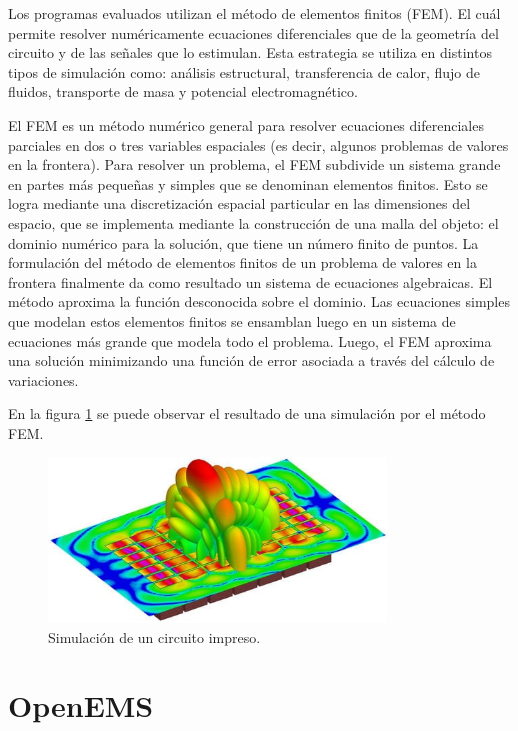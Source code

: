 \documentclass[
    11pt,
    spanish,
    a4paper
]{article}
\begin{document}
Los programas evaluados utilizan el método de elementos finitos (FEM). El cuál permite resolver numéricamente ecuaciones diferenciales que de la geometría del circuito y de las señales que lo estimulan.
Esta estrategia se utiliza en distintos tipos de simulación como: análisis estructural, transferencia de calor, flujo de fluidos, transporte de masa y potencial electromagnético.

El FEM es un método numérico general para resolver ecuaciones diferenciales parciales en dos o tres variables espaciales (es decir, algunos problemas de valores en la frontera).
Para resolver un problema, el FEM subdivide un sistema grande en partes más pequeñas y simples que se denominan elementos finitos.
Esto se logra mediante una discretización espacial particular en las dimensiones del espacio, que se implementa mediante la construcción de una malla del objeto: el dominio numérico para la solución, que tiene un número finito de puntos.
La formulación del método de elementos finitos de un problema de valores en la frontera finalmente da como resultado un sistema de ecuaciones algebraicas.
El método aproxima la función desconocida sobre el dominio.
Las ecuaciones simples que modelan estos elementos finitos se ensamblan luego en un sistema de ecuaciones más grande que modela todo el problema.
Luego, el FEM aproxima una solución minimizando una función de error asociada a través del cálculo de variaciones.

En la figura \ref{fig:simulacion_ejemplo} se puede observar el resultado de una simulación por el método FEM.

\begin{figure}[htbp]
	\centering
	\includegraphics[width=0.8\textwidth]{img/simulacion_1_01.jpg}
	\caption{Simulación de un circuito impreso.}
	\label{fig:simulacion_ejemplo}
\end{figure}

\newpage

\section{OpenEMS}
\end{document}
